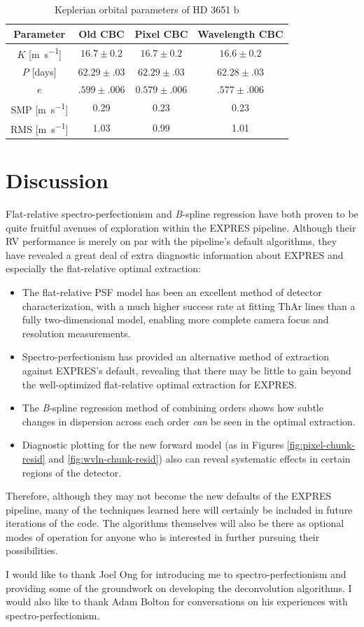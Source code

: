 \begin{table}
    \centering
    \begin{tabular}{c|ccc}
        \hline
        \hline
        Parameter & Old CBC & Pixel CBC & Wavelength CBC \\
        \hline
        $K$ [\si{\meter\per\second}] & $16.7 \pm 0.2$ & $16.7 \pm 0.2$ & $16.6 \pm 0.2$ \\
        $P$ [days] & $62.29 \pm .03$ & $62.29 \pm .03$ & $62.28 \pm .03 $\\
        $e$ & $.599 \pm .006$ & $0.579 \pm .006$ & $.577 \pm .006$ \\
        SMP [\si{\meter\per\second}] & 0.29 & 0.23 & 0.23 \\
        RMS [\si{\meter\per\second}] & 1.03 & 0.99 & 1.01 \\
    \end{tabular}
    \caption[HD 3651 -- Keplerian orbital parameter comparison (chunk method)]{Keplerian orbital parameters of HD 3651 b}
    \label{tab:cbc-rvs}
\end{table}


\section{Discussion} \label{pipeline2:discussion}

Flat-relative spectro-perfectionism and \textit{B}-spline regression have both proven to be quite fruitful avenues of exploration within the EXPRES pipeline. Although their RV performance is merely on par with the pipeline's default algorithms, they have revealed a great deal of extra diagnostic information about EXPRES and especially the flat-relative optimal extraction:
\begin{itemize}
    \item The flat-relative PSF model has been an excellent method of detector characterization, with a much higher success rate at fitting ThAr lines than a fully two-dimensional model, enabling more complete camera focus and resolution measurements.
    \item Spectro-perfectionism has provided an alternative method of extraction against EXPRES's default, revealing that there may be little to gain beyond the well-optimized flat-relative optimal extraction for EXPRES.
    \item The \textit{B}-spline regression method of combining orders shows how subtle changes in dispersion across each order \textit{can} be seen in the optimal extraction.
    \item Diagnostic plotting for the new forward model (as in Figures \ref{fig:pixel-chunk-resid} and \ref{fig:wvln-chunk-resid}) also can reveal systematic effects in certain regions of the detector.
\end{itemize}
Therefore, although they may not become the new defaults of the EXPRES pipeline, many of the techniques learned here will certainly be included in future iterations of the code. The algorithms themselves will also be there as optional modes of operation for anyone who is interested in further pursuing their possibilities.

I would like to thank Joel Ong for introducing me to spectro-perfectionism and providing some of the groundwork on developing the deconvolution algorithms. I would also like to thank Adam Bolton for conversations on his experiences with spectro-perfectionism.
